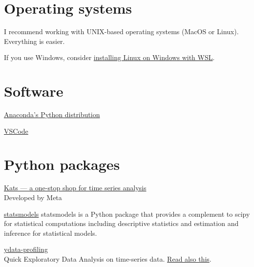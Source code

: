 \documentclass[
  letterpaper,
  DIV=11,
  numbers=noendperiod,
  oneside]{scrreprt}
\begin{document}

\hypertarget{operating-systems}{%
\section*{Operating systems}\label{operating-systems}}


I recommend working with UNIX-based operating systems (MacOS or Linux).
Everything is easier.

If you use Windows, consider
\href{https://learn.microsoft.com/en-us/windows/wsl/install}{installing
Linux on Windows with WSL}.

\hypertarget{software}{%
\section*{Software}\label{software}}


\href{https://www.anaconda.com/download}{Anaconda's Python distribution}

\href{https://code.visualstudio.com/download}{VSCode}

\hypertarget{python-packages}{%
\section*{Python packages}\label{python-packages}}


\href{https://engineering.fb.com/2021/06/21/open-source/kats/}{Kats ---
a one-stop shop for time series analysis}\\
Developed by Meta

\href{https://www.statsmodels.org/stable/}{statsmodels} statsmodels is a
Python package that provides a complement to scipy for statistical
computations including descriptive statistics and estimation and
inference for statistical models.

\href{https://ydata-profiling.ydata.ai/docs/master/pages/use_cases/time_series_datasets.html}{ydata-profiling}\\
Quick Exploratory Data Analysis on time-series data.
\href{https://towardsdatascience.com/how-to-do-an-eda-for-time-series-cbb92b3b1913}{Read
also this}.
\end{document}
